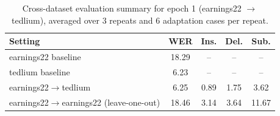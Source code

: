 \begin{table}[t]
\centering
\caption{Cross-dataset evaluation summary for epoch 1 (earnings22 $\rightarrow$ tedlium), averaged over 3 repeats and 6 adaptation cases per repeat.}
\begin{tabular}{lcccc}
\toprule
Setting & WER & Ins. & Del. & Sub. \\
\midrule
earnings22 baseline & 18.29 & -- & -- & -- \\
tedlium baseline & 6.23 & -- & -- & -- \\
earnings22$\rightarrow$tedlium & 6.25 & 0.89 & 1.75 & 3.62 \\
earnings22$\rightarrow$earnings22 (leave-one-out) & 18.46 & 3.14 & 3.64 & 11.67 \\
\bottomrule
\end{tabular}
\end{table}
